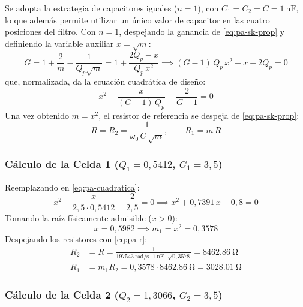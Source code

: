 Se adopta la estrategia de capacitores iguales ($n = 1$), con $C_1 = C_2 = C = \SI{1}{\nano\farad}$, lo que además
permite utilizar un único valor de capacitor en las cuatro posiciones del filtro. Con $n = 1$, despejando la ganancia
de \eqref{eq:pa-sk-prop} y definiendo la variable auxiliar $x = \sqrt{m}$:
\begin{equation}
  G = 1 + \frac{2}{m} - \frac{1}{Q_p \sqrt{m}} = 1 + \frac{2 Q_p - x}{Q_p\,x^2}
  \implies (G - 1)\,Q_p\,x^2 + x - 2 Q_p = 0
\end{equation}
que, normalizada, da la ecuación cuadrática de diseño:
\begin{equation}
  x^2 + \frac{x}{(G - 1)\,Q_p} - \frac{2}{G - 1} = 0
  \label{eq:pa-cuadratica}
\end{equation}
Una vez obtenido $m = x^2$, el resistor de referencia se despeja de \eqref{eq:pa-sk-prop}:
\begin{equation}
  R = R_2 = \frac{1}{\omega_0\,C\,\sqrt{m}}, \qquad R_1 = m\,R
  \label{eq:pa-r}
\end{equation}

\subsubsection{Cálculo de la Celda 1 ($Q_1 = 0{,}5412$, $G_1 = 3{,}5$)}

Reemplazando en \eqref{eq:pa-cuadratica}:
\begin{equation}
  x^2 + \frac{x}{2{,}5 \cdot 0{,}5412} - \frac{2}{2{,}5} = 0 \implies x^2 + 0{,}7391\,x - 0{,}8 = 0
\end{equation}
Tomando la raíz físicamente admisible ($x > 0$):
\begin{equation}
  x = 0{,}5982 \implies m_1 = x^2 = 0{,}3578
\end{equation}
Despejando los resistores con \eqref{eq:pa-r}:
\begin{align*}
  R_2 &= R = \frac{1}{\SI{197543}{\radian/\second} \cdot \SI{1}{\nano\farad} \cdot \sqrt{0{,}3578}}
    = \SI{8462.86}{\ohm} \\
  R_1 &= m_1 R_2 = 0{,}3578 \cdot \SI{8462.86}{\ohm} = \SI{3028.01}{\ohm}
\end{align*}

\subsubsection{Cálculo de la Celda 2 ($Q_2 = 1{,}3066$, $G_2 = 3{,}5$)}

